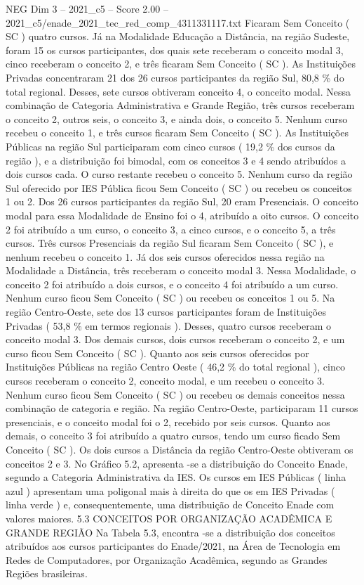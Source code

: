 \begin{textsample}{NEG Dim 3 – 2021\_c5 – Score 2.00 – 2021\_c5/enade\_2021\_tec\_red\_comp\_4311331117.txt}
Ficaram Sem Conceito ( SC ) quatro cursos.
Já na Modalidade Educação a Distância, na região Sudeste, foram 15 os cursos participantes, dos quais sete receberam o conceito modal 3, cinco receberam o conceito 2, e três ficaram Sem Conceito ( SC ).
As Instituições Privadas concentraram 21 dos 26 cursos participantes da região Sul, 80,8 \% do total regional.
Desses, sete cursos obtiveram conceito 4, o conceito modal.
Nessa combinação de Categoria Administrativa e Grande Região, três cursos receberam o conceito 2, outros seis, o conceito 3, e ainda dois, o conceito 5.
Nenhum curso recebeu o conceito 1, e três cursos ficaram Sem Conceito ( SC ).
As Instituições Públicas na região Sul participaram com cinco cursos ( 19,2 \% dos cursos da região ), e a distribuição foi bimodal, com os conceitos 3 e 4 sendo atribuídos a dois cursos cada.
O curso restante recebeu o conceito 5.
Nenhum curso da região Sul oferecido por IES Pública ficou Sem Conceito ( SC ) ou recebeu os conceitos 1 ou 2.
Dos 26 cursos participantes da região Sul, 20 eram Presenciais.
O conceito modal para essa Modalidade de Ensino foi o 4, atribuído a oito cursos.
O conceito 2 foi atribuído a um curso, o conceito 3, a cinco cursos, e o conceito 5, a três cursos.
Três cursos Presenciais da região Sul ficaram Sem Conceito ( SC ), e nenhum recebeu o conceito 1.
Já dos seis cursos oferecidos nessa região na Modalidade a Distância, três receberam o conceito modal 3.
Nessa Modalidade, o conceito 2 foi atribuído a dois cursos, e o conceito 4 foi atribuído a um curso.
Nenhum curso ficou Sem Conceito ( SC ) ou recebeu os conceitos 1 ou 5.
Na região Centro-Oeste, sete dos 13 cursos participantes foram de Instituições Privadas ( 53,8 \% em termos regionais ).
Desses, quatro cursos receberam o conceito modal 3.
Dos demais cursos, dois cursos receberam o conceito 2, e um curso ficou Sem Conceito ( SC ).
Quanto aos seis cursos oferecidos por Instituições Públicas na região Centro Oeste ( 46,2 \% do total regional ), cinco cursos receberam o conceito 2, conceito modal, e um recebeu o conceito 3.
Nenhum curso ficou Sem Conceito ( SC ) ou recebeu os demais conceitos nessa combinação de categoria e região.
Na região Centro-Oeste, participaram 11 cursos presenciais, e o conceito modal foi o 2, recebido por seis cursos.
Quanto aos demais, o conceito 3 foi atribuído a quatro cursos, tendo um curso ficado Sem Conceito ( SC ).
Os dois cursos a Distância da região Centro-Oeste obtiveram os conceitos 2 e 3.
No Gráfico 5.2, apresenta -se a distribuição do Conceito Enade, segundo a Categoria Administrativa da IES.
Os cursos em IES Públicas ( linha azul ) apresentam uma poligonal mais à direita do que os em IES Privadas ( linha verde ) e, consequentemente, uma distribuição de Conceito Enade com valores maiores. 5.3 CONCEITOS POR ORGANIZAÇÃO ACADÊMICA E GRANDE REGIÃO Na Tabela 5.3, encontra -se a distribuição dos conceitos atribuídos aos cursos participantes do Enade/2021, na Área de Tecnologia em Redes de Computadores, por Organização Acadêmica, segundo as Grandes Regiões brasileiras.

\end{textsample}

